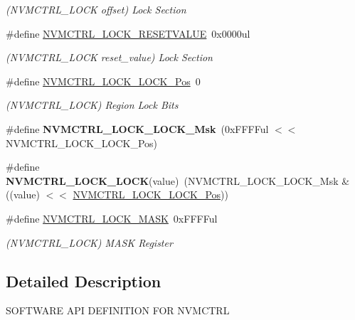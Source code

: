 \begin{DoxyCompactItemize}
\begin{DoxyCompactList}\small\item\em (N\+V\+M\+C\+T\+R\+L\+\_\+\+L\+O\+C\+K offset) Lock Section \end{DoxyCompactList}\item 
\hypertarget{group___s_a_m_l21___n_v_m_c_t_r_l_ga5aff098bc10d43dd406efed4369c53b6}{}\#define \hyperlink{group___s_a_m_l21___n_v_m_c_t_r_l_ga5aff098bc10d43dd406efed4369c53b6}{N\+V\+M\+C\+T\+R\+L\+\_\+\+L\+O\+C\+K\+\_\+\+R\+E\+S\+E\+T\+V\+A\+L\+U\+E}~0x0000ul\label{group___s_a_m_l21___n_v_m_c_t_r_l_ga5aff098bc10d43dd406efed4369c53b6}

\begin{DoxyCompactList}\small\item\em (N\+V\+M\+C\+T\+R\+L\+\_\+\+L\+O\+C\+K reset\+\_\+value) Lock Section \end{DoxyCompactList}\item 
\hypertarget{group___s_a_m_l21___n_v_m_c_t_r_l_ga7e641135617433c92419f3c6272c0856}{}\#define \hyperlink{group___s_a_m_l21___n_v_m_c_t_r_l_ga7e641135617433c92419f3c6272c0856}{N\+V\+M\+C\+T\+R\+L\+\_\+\+L\+O\+C\+K\+\_\+\+L\+O\+C\+K\+\_\+\+Pos}~0\label{group___s_a_m_l21___n_v_m_c_t_r_l_ga7e641135617433c92419f3c6272c0856}

\begin{DoxyCompactList}\small\item\em (N\+V\+M\+C\+T\+R\+L\+\_\+\+L\+O\+C\+K) Region Lock Bits \end{DoxyCompactList}\item 
\hypertarget{group___s_a_m_l21___n_v_m_c_t_r_l_ga7bd561a9c9c43c4f0272f91528fa8b55}{}\#define {\bfseries N\+V\+M\+C\+T\+R\+L\+\_\+\+L\+O\+C\+K\+\_\+\+L\+O\+C\+K\+\_\+\+Msk}~(0x\+F\+F\+F\+Ful $<$$<$ N\+V\+M\+C\+T\+R\+L\+\_\+\+L\+O\+C\+K\+\_\+\+L\+O\+C\+K\+\_\+\+Pos)\label{group___s_a_m_l21___n_v_m_c_t_r_l_ga7bd561a9c9c43c4f0272f91528fa8b55}

\item 
\hypertarget{group___s_a_m_l21___n_v_m_c_t_r_l_gadfd6303702a1ec835b3959a2001b73a2}{}\#define {\bfseries N\+V\+M\+C\+T\+R\+L\+\_\+\+L\+O\+C\+K\+\_\+\+L\+O\+C\+K}(value)~(N\+V\+M\+C\+T\+R\+L\+\_\+\+L\+O\+C\+K\+\_\+\+L\+O\+C\+K\+\_\+\+Msk \& ((value) $<$$<$ \hyperlink{group___s_a_m_l21___n_v_m_c_t_r_l_ga7e641135617433c92419f3c6272c0856}{N\+V\+M\+C\+T\+R\+L\+\_\+\+L\+O\+C\+K\+\_\+\+L\+O\+C\+K\+\_\+\+Pos}))\label{group___s_a_m_l21___n_v_m_c_t_r_l_gadfd6303702a1ec835b3959a2001b73a2}

\item 
\hypertarget{group___s_a_m_l21___n_v_m_c_t_r_l_ga5d4ac6aa3fe484566828978a57d521c9}{}\#define \hyperlink{group___s_a_m_l21___n_v_m_c_t_r_l_ga5d4ac6aa3fe484566828978a57d521c9}{N\+V\+M\+C\+T\+R\+L\+\_\+\+L\+O\+C\+K\+\_\+\+M\+A\+S\+K}~0x\+F\+F\+F\+Ful\label{group___s_a_m_l21___n_v_m_c_t_r_l_ga5d4ac6aa3fe484566828978a57d521c9}

\begin{DoxyCompactList}\small\item\em (N\+V\+M\+C\+T\+R\+L\+\_\+\+L\+O\+C\+K) M\+A\+S\+K Register \end{DoxyCompactList}\end{DoxyCompactItemize}


\subsection{Detailed Description}
S\+O\+F\+T\+W\+A\+R\+E A\+P\+I D\+E\+F\+I\+N\+I\+T\+I\+O\+N F\+O\+R N\+V\+M\+C\+T\+R\+L 